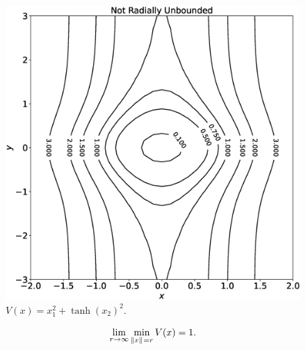 \begin{frame}
\begin{columns}
\begin{column}{0.5\textwidth}
\begin{figure}[bth]
                \includegraphics[width=1.0\textwidth]{figures/lyap_candidate_not_unbd.eps} 
                \caption{\footnotesize $V(x) = x_1^2 + \tanh{(x_2)}^2.$}
            \end{figure}
            \[ \lim_{r \to \infty} \min_{\|{x}\|_{{}_{}}=r} V(x) = 1. \]
        \end{column}
    \end{columns}
\end{frame}


